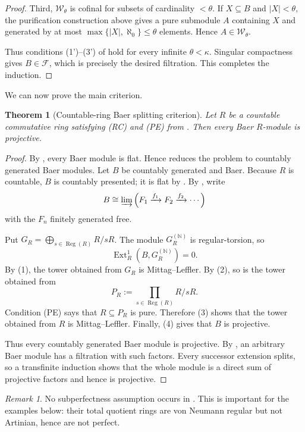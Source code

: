 \documentclass[11pt]{article}
\newtheorem{theorem}{Theorem}[section]
\theoremstyle{definition}
\theoremstyle{remark}
\newtheorem{remark}[remark]{Remark}
\newcommand{\Reg}{\operatorname{Reg}}
\newcommand{\Ext}{\operatorname{Ext}}
\begin{document}
\begin{proof}
Third, $\mathscr W_\theta$ is cofinal for subsets of cardinality $<\theta$.
If $X\subseteq B$ and $|X|<\theta$, the purification construction above gives
a pure submodule $A$ containing $X$ and generated by at most
$\max\{|X|,\aleph_0\}\le\theta$ elements.  Hence $A\in\mathscr W_\theta$.

Thus conditions (1')--(3') of \cite[Theorem~10]{EFS} hold for every infinite
$\theta<\kappa$.  Singular compactness gives $B\in\mathcal F$, which is
precisely the desired filtration.  This completes the induction.
\end{proof}

We can now prove the main criterion.

\begin{theorem}[Countable-ring Baer splitting criterion]\label{thm:criterion}
Let $R$ be a countable commutative ring satisfying \textup{(RC)} and
\textup{(PE)} from .  Then every Baer $R$-module is projective.
\end{theorem}

\begin{proof}
By , every Baer module is flat.  Hence
 reduces the problem to countably generated Baer modules.
Let $B$ be countably generated and Baer.  Because $R$ is countable, $B$ is
countably presented; it is flat by .  By
\cite[Proposition~3.1]{ABH}, write
\[
 B\cong\varinjlim
 \left(F_1\xrightarrow{f_1}F_2\xrightarrow{f_2}\cdots\right)
\]
with the $F_n$ finitely generated free.

Put $G_R=\bigoplus_{s\in\Reg(R)}R/sR$.  The module
$G_R^{(\mathbb N)}$ is regular-torsion, so
\[
 \Ext_R^1(B,G_R^{(\mathbb N)})=0.
\]
By (1), the tower obtained from $G_R$ is
Mittag--Leffler.  By (2), so is the tower obtained from
\[
 P_R:=\prod_{s\in\Reg(R)}R/sR.
\]
Condition (PE) says that $R\subseteq P_R$ is pure.  Therefore
(3) shows that the tower obtained from $R$ is
Mittag--Leffler.  Finally, (4) gives that $B$ is
projective.

Thus every countably generated Baer module is projective.  By
, an arbitrary Baer module has a filtration with such
factors.  Every successor extension splits, so a transfinite induction shows
that the whole module is a direct sum of projective factors and hence is
projective.
\end{proof}

\begin{remark}\label{rem:subperfect}
No subperfectness assumption occurs in .  This is important
for the examples below: their total quotient rings are von Neumann regular but
not Artinian, hence are not perfect.
\end{remark}
\end{document}
